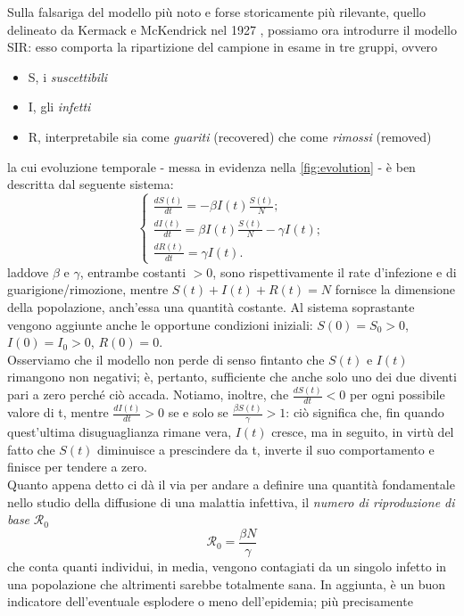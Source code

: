 Sulla falsariga del modello più noto e forse storicamente più rilevante, quello delineato da Kermack e McKendrick nel 1927 \cite{Kermack}, possiamo ora introdurre il modello SIR: esso comporta la ripartizione del campione in esame in tre gruppi, ovvero
\begin{itemize}
\item S, i \emph{suscettibili}
\item I, gli \emph{infetti}
\item R, interpretabile sia come \emph{guariti} (recovered) che come \emph{rimossi} (removed)
\end{itemize}
la cui evoluzione temporale - messa in evidenza nella \cref{fig:evolution} - è ben descritta dal seguente sistema:
\begin{equation}
\begin{cases}
\frac{dS(t)}{dt} = - \beta I(t) \frac{S(t)}{N}; \\
\frac{dI(t)}{dt} = \beta I(t) \frac{S(t)}{N} - \gamma I(t); \\
\frac{dR(t)}{dt} = \gamma I(t).
\end{cases} 
\label{SIR}
\end{equation}
laddove $\beta$ e $\gamma$, entrambe costanti $> 0$, sono rispettivamente il rate d'infezione e di guarigione/rimozione, mentre $S(t) + I(t) + R(t) = N$ fornisce la dimensione della popolazione, anch'essa una quantità costante. Al sistema soprastante vengono aggiunte anche le opportune condizioni iniziali: $S(0) = S_0 > 0$, $I(0) = I_0 > 0$, $R(0) = 0$. 
\\Osserviamo che il modello non perde di senso fintanto che $S(t)$ e $I(t)$ rimangono non negativi; è, pertanto, sufficiente che anche solo uno dei due diventi pari a zero perché ciò accada. Notiamo, inoltre, che $\frac{dS(t)}{dt} < 0$ per ogni possibile valore di t, mentre $\frac{dI(t)}{dt} > 0$ se e solo se $\frac{\beta S(t)}{\gamma} > 1$: ciò significa che, fin quando quest'ultima disuguaglianza rimane vera, $I(t)$ cresce, ma in seguito, in virtù del fatto che $S(t)$ diminuisce a prescindere da t, inverte il suo comportamento e finisce per tendere a zero. \\ Quanto appena detto ci dà il via per andare a definire una quantità fondamentale nello studio della diffusione di una malattia infettiva, il \emph{numero di riproduzione di base} $\mathcal{R}_0$ 
\begin{equation}
\mathcal{R}_0 = \frac{\beta N}{\gamma}
\end{equation}
che conta quanti individui, in media, vengono contagiati da un singolo infetto in una popolazione che altrimenti sarebbe totalmente sana. In aggiunta, è un buon indicatore dell'eventuale esplodere o meno dell'epidemia; più precisamente
